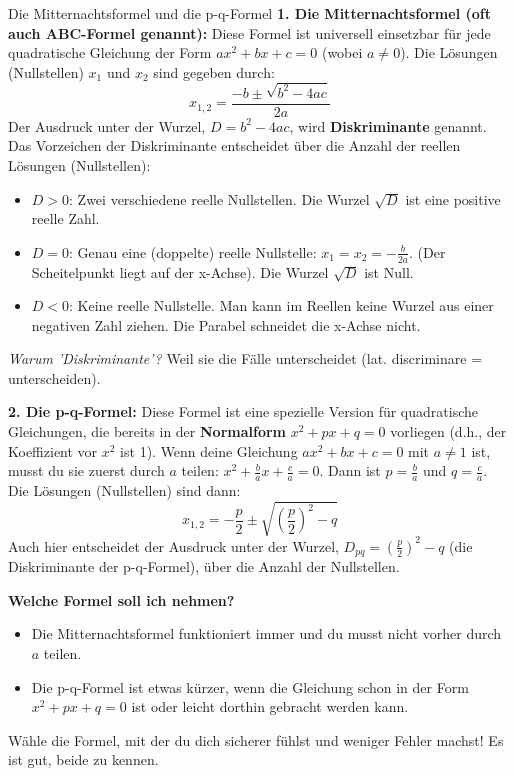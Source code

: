 \begin{merksatzumgebung}{Die Mitternachtsformel und die p-q-Formel}
\textbf{1. Die Mitternachtsformel (oft auch ABC-Formel genannt):}
Diese Formel ist universell einsetzbar für jede quadratische Gleichung der Form $ax^2+bx+c=0$ (wobei $a \neq 0$).
Die Lösungen (Nullstellen) $x_1$ und $x_2$ sind gegeben durch:
\[ x_{1,2} = \frac{-b \pm \sqrt{b^2 - 4ac}}{2a} \]
Der Ausdruck unter der Wurzel, $D = b^2 - 4ac$, wird \textbf{Diskriminante} genannt. Das Vorzeichen der Diskriminante entscheidet über die Anzahl der reellen Lösungen (Nullstellen):
\begin{itemize}
    \item $D > 0$: Zwei verschiedene reelle Nullstellen. Die Wurzel $\sqrt{D}$ ist eine positive reelle Zahl.
    \item $D = 0$: Genau eine (doppelte) reelle Nullstelle: $x_1 = x_2 = -\frac{b}{2a}$. (Der Scheitelpunkt liegt auf der x-Achse). Die Wurzel $\sqrt{D}$ ist Null.
    \item $D < 0$: Keine reelle Nullstelle. Man kann im Reellen keine Wurzel aus einer negativen Zahl ziehen. Die Parabel schneidet die x-Achse nicht.
\end{itemize}
\textit{Warum 'Diskriminante'?} Weil sie die Fälle unterscheidet (lat. discriminare = unterscheiden).

\textbf{2. Die p-q-Formel:}
Diese Formel ist eine spezielle Version für quadratische Gleichungen, die bereits in der \textbf{Normalform} $x^2+px+q=0$ vorliegen (d.h., der Koeffizient vor $x^2$ ist 1).
Wenn deine Gleichung $ax^2+bx+c=0$ mit $a \neq 1$ ist, musst du sie zuerst durch $a$ teilen: $x^2 + \frac{b}{a}x + \frac{c}{a} = 0$. Dann ist $p = \frac{b}{a}$ und $q = \frac{c}{a}$.
Die Lösungen (Nullstellen) sind dann:
\[ x_{1,2} = -\frac{p}{2} \pm \sqrt{\left(\frac{p}{2}\right)^2 - q} \]
Auch hier entscheidet der Ausdruck unter der Wurzel, $D_{pq} = \left(\frac{p}{2}\right)^2 - q$ (die Diskriminante der p-q-Formel), über die Anzahl der Nullstellen.

\textbf{Welche Formel soll ich nehmen?}
\begin{itemize}
    \item Die Mitternachtsformel funktioniert immer und du musst nicht vorher durch $a$ teilen.
    \item Die p-q-Formel ist etwas kürzer, wenn die Gleichung schon in der Form $x^2+px+q=0$ ist oder leicht dorthin gebracht werden kann.
\end{itemize}
Wähle die Formel, mit der du dich sicherer fühlst und weniger Fehler machst! Es ist gut, beide zu kennen.
\end{merksatzumgebung}

